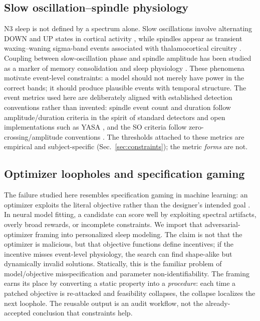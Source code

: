 \documentclass[conference]{IEEEtran}
\begin{document}
\subsection{Slow oscillation--spindle physiology}
N3 sleep is not defined by a spectrum alone. Slow oscillations involve
alternating DOWN and UP states in cortical activity \cite{steriade1993,
massimini2004}, while spindles appear as transient waxing--waning sigma-band
events associated with thalamocortical circuitry \cite{molle2011,helfrich2018}.
Coupling between slow-oscillation phase and spindle amplitude has been studied
as a marker of memory consolidation and sleep physiology
\cite{tort2010,canolty2006,mander2015}. These phenomena motivate event-level
constraints: a model should not merely have power in the correct bands; it
should produce plausible events with temporal structure. The event metrics used
here are deliberately aligned with established detection conventions rather than
invented: spindle event count and duration follow amplitude/duration criteria
in the spirit of standard detectors \cite{molle2011,ferrarelli2007} and open
implementations such as YASA \cite{vallat2021}, and the SO criteria follow
zero-crossing/amplitude conventions \cite{steriade1993,massimini2004}. The
thresholds attached to these metrics are empirical and subject-specific
(Sec.~\ref{sec:constraints}); the metric \emph{forms} are not.

\subsection{Optimizer loopholes and specification gaming}
The failure studied here resembles specification gaming in machine learning: an
optimizer exploits the literal objective rather than the designer's intended
goal \cite{krakovna2020,amodei2016}. In neural model fitting, a candidate can
score well by exploiting spectral artifacts, overly broad rewards, or
incomplete constraints. We import that adversarial-optimizer framing into
personalized sleep modeling. The claim is not that the optimizer is malicious,
but that objective functions define incentives; if the incentive misses
event-level physiology, the search can find shape-alike but dynamically invalid
solutions. Statically, this is the familiar problem of model/objective
misspecification and parameter non-identifiability. The framing earns its place
by converting a static property into a \emph{procedure}: each time a patched
objective is re-attacked and feasibility collapses, the collapse localizes the
next loophole. The reusable output is an audit workflow, not the
already-accepted conclusion that constraints help.
\end{document}
